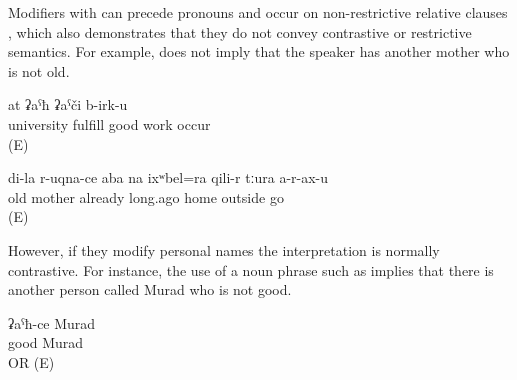 Modifiers with  can precede pronouns and occur on non-restrictive relative clauses , which also demonstrates that they do not convey contrastive or restrictive semantics. For example,  does not imply that the speaker has another mother who is not old.
%
\begin{exe}
	\ex	\label{ex:You who has finished the university will get a good job minor}
		at	ʡaˁħ	ʡaˁči	b-irk-u\\
		university	fulfill		good	work	occur\\
	\glt	{} (E)
	
	\ex	\label{ex:My old mother already since long ago does not leave the house minor}
	\gll	di-la	r-uqna-ce	aba	na	ixʷbel=ra	qili-r	tːura	a-r-ax-u\\
			old	mother	already	long.ago	home	outside	go\\
	\glt	{} (E)
\end{exe}

However, if they modify personal names the interpretation is normally contrastive. For instance, the use of a noun phrase such as  implies that there is another person called Murad who is not good.
%
\begin{exe}
	\ex	\label{ex:the good Murad minor}
	\gll	ʡaˁħ-ce	Murad\\
		good	Murad\\
	\glt	{} OR  (E)
\end{exe}



